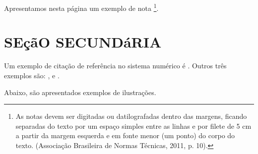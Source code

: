 \documentclass[
        oneside, %
        english,
        brazil
        ]{abntbibufjf}
\begin{document}
Apresentamos nesta página um exemplo de nota \footnote{As notas devem ser digitadas ou datilografadas dentro das margens, ficando separadas do texto
    por um espaço simples entre as linhas e por filete de 5 cm a partir da margem esquerda e em fonte menor (um ponto) do corpo do texto. (Associação
    Brasileira de Normas T\'ecnicas, 2011, p. 10).}.




\section{SEçãO SECUNDáRIA} %

Um exemplo de citação de referência no sistema num\'erico \'e \cite{disp2019}. Outros três exemplos são: \cite{Bauman99}, \cite{vet18} e
\cite{Aguiar2009}.










Abaixo, são apresentados exemplos de ilustraç\~oes.

\end{document}
